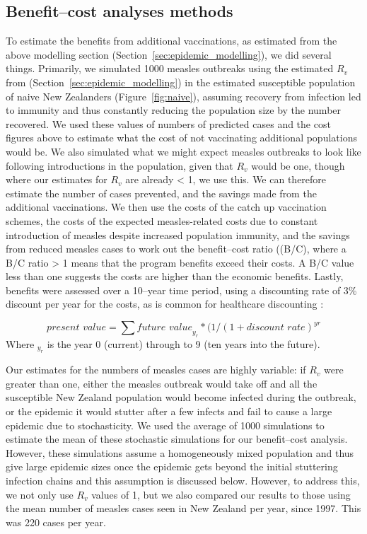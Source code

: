 \documentclass{article}
\begin{document}
\subsection{Benefit--cost analyses methods}
To estimate the benefits from additional vaccinations, as estimated from the above modelling section (Section~\ref{sec:epidemic_modelling}), we did several things. Primarily, we simulated 1000 measles outbreaks using the estimated $R_v$ from (Section~\ref{sec:epidemic_modelling}) in the estimated susceptible population of naive New Zealanders (Figure~\ref{fig:naive}), assuming recovery from infection led to immunity and thus constantly reducing the population size by the number recovered. We used these values of numbers of predicted cases and the cost figures above to estimate what the cost of not vaccinating additional populations would be. We also simulated what we might expect measles outbreaks to look like following introductions in the population, given that $R_v$ would be one, though where our estimates for $R_v$ are already < 1, we use this. We can therefore estimate the number of cases prevented, and the savings made from the additional vaccinations. We then use the costs of the catch up vaccination schemes, the costs of the expected measles-related costs due to constant introduction of measles despite increased population immunity, and the savings from reduced measles cases to work out the benefit--cost ratio ((B/C), where a B/C ratio > 1 means that the program benefits exceed their costs. A B/C value less than one suggests the costs are higher than the economic benefits. Lastly, benefits were assessed over a 10--year time period, using a discounting rate of 3\% discount per year for the costs, as is common for healthcare discounting \citep{honeycutt6}:

\begin{equation} \label{eq:disc}
\textit{present value} = \sum \textit{future value}_y_r * (1/(1+\textit{discount rate})^{yr}
  \end{equation}
Where $_y_r$ is the year 0 (current) through to 9 (ten years into the future).

Our estimates for the numbers of measles cases are highly variable: if $R_v$ were greater than one, either the measles outbreak would take off and all the susceptible New Zealand population would become infected during the outbreak, or the epidemic it would stutter after a few infects and fail to cause a large epidemic due to stochasticity. We used the average of 1000 simulations to estimate the mean of these stochastic simulations for our benefit--cost analysis. However, these simulations assume a homogeneously mixed population and thus give large epidemic sizes once the epidemic gets beyond the initial stuttering infection chains and this assumption is discussed below. However, to address this, we not only use $R_v$ values of 1, but we also compared our results to those using the mean number of measles cases seen in New Zealand per year, since 1997. This was 220 cases per year.
\end{document}
